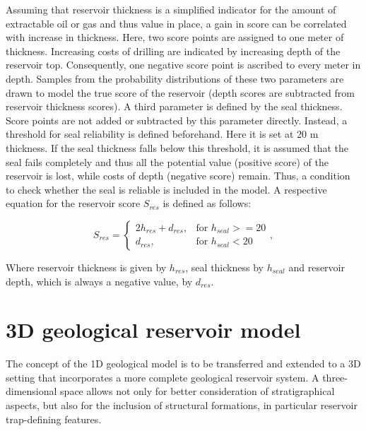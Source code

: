 	        Assuming that reservoir thickness is a simplified indicator for the amount of extractable oil or gas and thus value in place, a gain in score can be correlated with increase in thickness. Here, two score points are assigned to one meter of thickness. Increasing costs of drilling are indicated by increasing depth of the reservoir top. Consequently, one negative score point is ascribed to every meter in depth. Samples from the probability distributions of these two parameters are drawn to model the true score of the reservoir (depth scores are subtracted from reservoir thickness scores).
	        A third parameter is defined by the seal thickness. Score points are not added or subtracted by this parameter directly. Instead, a threshold for seal reliability is defined beforehand. Here it is set at 20 m thickness. If the seal thickness falls below this threshold, it is assumed that the seal fails completely and thus all the potential value (positive score) of the reservoir is lost, while costs of depth (negative score) remain. Thus, a condition to check whether the seal is reliable is included in the model. A respective equation for the reservoir score $S_{res}$ is defined as follows:
			
			\begin{equation}\label{eq:1D_score_system}
			S_{res} = 
			\begin{cases}
			2h_{res} + d_{res}, & \text{for } h_{seal} >= 20  \\
			d_{res}, & \text{for } h_{seal} < 20
			\end{cases},
			\end{equation}
			
			Where reservoir thickness is given by $h_{res}$, seal thickness by $h_{seal}$ and reservoir depth, which is always a negative value, by $d_{res}$.
		
		\section{3D geological reservoir model}
		The concept of the 1D geological model is to be transferred and extended to a 3D setting that incorporates a more complete geological reservoir system. A three-dimensional space allows not only for better consideration of stratigraphical aspects, but also for the inclusion of structural formations, in particular reservoir trap-defining features.
		
